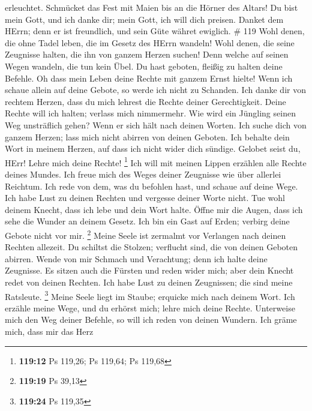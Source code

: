 erleuchtet. Schmücket das Fest mit Maien bis an die Hörner des Altars!
 Du bist mein Gott, und ich danke dir; mein Gott, ich will
dich preisen.  Danket dem HErrn; denn er ist freundlich,
und sein Güte währet ewiglich. \# 119  Wohl denen, die ohne
Tadel leben, die im Gesetz des HErrn wandeln!  Wohl denen,
die seine Zeugnisse halten, die ihn von ganzem Herzen suchen!
 Denn welche auf seinen Wegen wandeln, die tun kein Übel.
 Du hast geboten, fleißig zu halten deine Befehle.
 Oh dass mein Leben deine Rechte mit ganzem Ernst hielte!
 Wenn ich schaue allein auf deine Gebote, so werde ich nicht
zu Schanden.  Ich danke dir von rechtem Herzen, dass du mich
lehrest die Rechte deiner Gerechtigkeit.  Deine Rechte will
ich halten; verlass mich nimmermehr.  Wie wird ein Jüngling
seinen Weg unsträflich gehen? Wenn er sich hält nach deinen Worten.
 Ich suche dich von ganzem Herzen; lass mich nicht abirren
von deinen Geboten.  Ich behalte dein Wort in meinem
Herzen, auf dass ich nicht wider dich sündige.  Gelobet
seist du, HErr! Lehre mich deine Rechte! \footnote{\textbf{119:12} Ps
  119,26; Ps 119,64; Ps 119,68}  Ich will mit meinen Lippen
erzählen alle Rechte deines Mundes.  Ich freue mich des
Weges deiner Zeugnisse wie über allerlei Reichtum.  Ich
rede von dem, was du befohlen hast, und schaue auf deine Wege.
 Ich habe Lust zu deinen Rechten und vergesse deiner Worte
nicht.  Tue wohl deinem Knecht, dass ich lebe und dein Wort
halte.  Öffne mir die Augen, dass ich sehe die Wunder an
deinem Gesetz.  Ich bin ein Gast auf Erden; verbirg deine
Gebote nicht vor mir. \footnote{\textbf{119:19} Ps 39,13} 
Meine Seele ist zermalmt vor Verlangen nach deinen Rechten allezeit.
 Du schiltst die Stolzen; verflucht sind, die von deinen
Geboten abirren.  Wende von mir Schmach und Verachtung;
denn ich halte deine Zeugnisse.  Es sitzen auch die Fürsten
und reden wider mich; aber dein Knecht redet von deinen Rechten.
 Ich habe Lust zu deinen Zeugnissen; die sind meine
Ratsleute. \footnote{\textbf{119:24} Ps 119,35}  Meine
Seele liegt im Staube; erquicke mich nach deinem Wort.  Ich
erzähle meine Wege, und du erhörst mich; lehre mich deine Rechte.
 Unterweise mich den Weg deiner Befehle, so will ich reden
von deinen Wundern.  Ich gräme mich, dass mir das Herz
